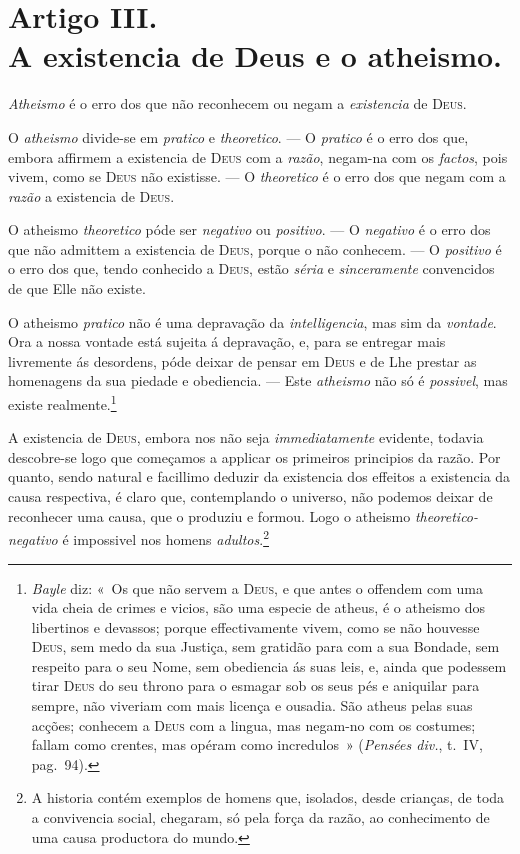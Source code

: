 
\section*{Artigo III.\\ A existencia de Deus e o atheismo.}

\emph{Atheismo} é o erro dos que não reconhecem ou negam a \emph{existencia} de
\textsc{Deus}.

O \emph{atheismo} divide-se em \emph{pratico} e \emph{theoretico}. --- O \emph{pratico}
é o erro dos que, embora affirmem a existencia de \textsc{Deus} com a \emph{razão},
negam-na com os \emph{factos}, pois vivem, como se \textsc{Deus} não existisse. --- O
\emph{theoretico} é o erro dos que negam com a \emph{razão} a existencia de
\textsc{Deus}.

O atheismo \emph{theoretico} póde ser \emph{negativo} ou \emph{positivo}. --- O
\emph{negativo} é o erro dos que não admittem a existencia de \textsc{Deus}, porque o
não conhecem. --- O \emph{positivo} é o erro dos que, tendo conhecido a \textsc{Deus},
estão \emph{séria} e \emph{sinceramente} convencidos de que Elle não existe.

O atheismo \emph{pratico} não é uma depravação da \emph{intelligencia}, mas sim da
\emph{vontade}. Ora a nossa vontade está sujeita á depravação, e, para se entregar mais
livremente ás desordens, póde deixar de pensar em \textsc{Deus} e de Lhe prestar as
homenagens da sua piedade e obediencia. --- Este \emph{atheismo} não só é
\emph{possivel}, mas existe realmente.\footnote{\emph{Bayle} diz: «~Os que não servem a
\textsc{Deus}, e que antes o offendem com uma vida cheia de crimes e vicios, são uma
especie de atheus, é o atheismo dos libertinos e devassos; porque effectivamente vivem,
como se não houvesse \textsc{Deus}, sem medo da sua Justiça, sem gratidão para com a sua
Bondade, sem respeito para o seu Nome, sem obediencia ás suas leis, e, ainda que
podessem tirar \textsc{Deus} do seu throno para o esmagar sob os seus pés e aniquilar
para sempre, não viveriam com mais licença e ousadia. São atheus pelas suas acções;
conhecem a \textsc{Deus} com a lingua, mas negam-no com os costumes; fallam como crentes,
mas opéram como incredulos~» (\emph{Pensées div.}, t.~IV, pag.~94).}

A existencia de \textsc{Deus}, embora nos não seja \emph{immediatamente} evidente,
todavia descobre-se logo que começamos a applicar os primeiros principios da razão. Por
quanto, sendo natural e facillimo deduzir da existencia dos effeitos a existencia da
causa respectiva, é claro que, contemplando o universo, não podemos deixar de reconhecer
uma causa, que o
 produziu e formou. Logo o atheismo \emph{theoretico-negativo} é impossivel nos
homens \emph{adultos}.\footnote{A historia contém exemplos de homens que, isolados,
desde crianças, de toda a convivencia social, chegaram, só pela força da razão, ao
conhecimento de uma causa productora do mundo.}

